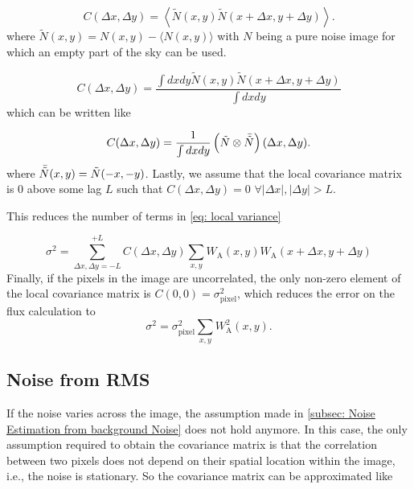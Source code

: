 \begin{equation}
    C(\Delta x, \Delta y) = \left\langle \tilde{N}(x,y)\tilde{N}(x+\Delta x,y+\Delta y)\right\rangle.
\end{equation}
where $\tilde{N}(x,y)=N(x,y) - \langle N(x,y)\rangle$ with $N$ being a pure noise image for which an empty part of the sky can be used.

\begin{equation}
    C(\Delta x, \Delta y) = \frac{\int dx dy \tilde{N}(x,y)\tilde{N}(x+\Delta x,y+\Delta y)}{\int dx dy} 
\end{equation}
which can be written like

\begin{equation}
    C(\Delta x, \Delta y) = \frac{1}{\int dx dy}\left(\tilde{N} \otimes\Bar{\tilde{N}}\right)(\Delta x, \Delta y).
\end{equation}
where $\Bar{\tilde{N}}(x,y)=\tilde{N}(-x,-y)$.
Lastly, we assume that the local covariance matrix is 0 above some lag $L$ such that $C(\Delta x, \Delta y) = 0$ $\forall|\Delta x|, |\Delta y| > L$.

\noindent This reduces the number of terms in \autoref{eq: local variance}

\begin{equation}\label{eq: variance correlated}
    \sigma^2 = \sum_{\Delta x, \Delta y=-L}^{+L}C(\Delta x, \Delta y)\sum_{x,y}W_\mathrm{A}(x,y)W_\mathrm{A}(x+\Delta x,y + \Delta y)
\end{equation}
Finally, if the pixels in the image are uncorrelated, the only non-zero element of the local covariance matrix is $C(0,0) = \sigma_\mathrm{pixel}^2$, which reduces the error on the flux calculation to
\begin{equation}\label{eq: variance uncorrelated}
    \sigma^2 = \sigma^2_\mathrm{pixel}\sum_{x,y}W^2_\mathrm{A}(x,y).
\end{equation}

\subsection{Noise from RMS}\label{subsec: Noise from RMS}
If the noise varies across the image, the assumption made in \autoref{subsec: Noise Estimation from background Noise} does not hold anymore. In this case, the only assumption required to obtain the covariance matrix is that the correlation between two pixels does not depend on their spatial location within the image, i.e., the noise is stationary. So the covariance matrix can be approximated like

